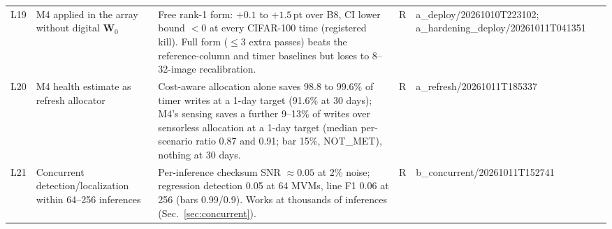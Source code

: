 \documentclass[journal]{IEEEtran}
\newcommand{\mfour}{\textsc{M4}}
\newcommand{\bviii}{\textsc{B8}}
\newcommand{\pt}{\,pt}
\newcommand{\W}{\mathbf{W}}
\begin{document}
\begin{table}[t]
\begin{tabular}{p{0.5cm}p{3.9cm}p{8.8cm}p{0.5cm}p{2.5cm}}
L19 & \mfour{} applied in the array without digital $\W_0$ & Free rank-1 form: $+0.1$ to $+1.5$\pt{} over \bviii, CI lower bound $<0$ at every CIFAR-100 time (registered kill). Full form ($\le3$ extra passes) beats the reference-column and timer baselines but loses to 8--32-image recalibration. & R & a\_deploy/\allowbreak 20261010T223102; a\_hardening\_deploy/\allowbreak 20261011T041351 \\
L20 & \mfour{} health estimate as refresh allocator & Cost-aware allocation alone saves 98.8 to 99.6\% of timer writes at a 1-day target (91.6\% at 30 days); \mfour's sensing saves a further 9--13\% of writes over sensorless allocation at a 1-day target (median per-scenario ratio 0.87 and 0.91; bar 15\%, NOT\_MET), nothing at 30 days. & R & a\_refresh/\allowbreak 20261011T185337 \\
L21 & Concurrent detection/localization within 64--256 inferences & Per-inference checksum SNR $\approx0.05$ at 2\% noise; regression detection 0.05 at 64 MVMs, line F1 0.06 at 256 (bars 0.99/0.9). Works at thousands of inferences (Sec.~\ref{sec:concurrent}). & R & b\_concurrent/\allowbreak 20261011T152741 \\
\bottomrule
\end{tabular}
\end{table}
\end{document}

